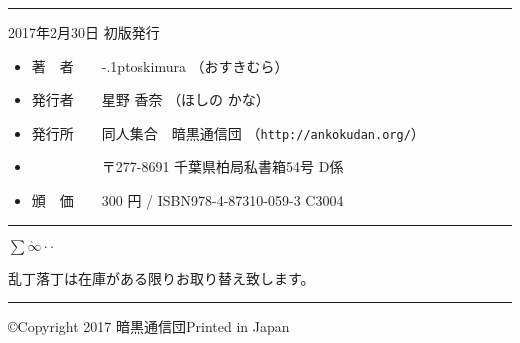 %
\pagestyle{empty}
\mbox{}
\vfill

\baselineskip12pt\parskip0sp\scriptsize\bfseries
\def\cons{\displaystyle\sum \!\!\!\!\!\! \grave{\infty}
\!\!\!\!\!\!\cdot \cdot}

\rule{8cm}{1mm}\par
2017年2月30日 初版発行\par
\begin{itemize}\itemsep0mm\itemindent-5mm\item[]
著　者　　\kern-.1pt{}oskimura {\tiny （おすきむら）}\item[]
発行者　　星野 香奈 {\tiny （ほしの かな）}\item[]
発行所　　{\tiny 同人集合　}暗黒通信団
（\verb!http://ankokudan.org/!）\item[]
　　　　　{\scriptsize 〒277-8691 千葉県柏局私書箱54号 D係}\item[]
頒　価　　300 円 / ISBN978-4-87310-059-3 C3004 \\[-3mm]%
\end{itemize}

\rule{8cm}{1mm}\par
\parbox{8cm}{\hfill{\normalsize$\cons$}{\normalfont\scriptsize
\hfill\parbox{7cm}{
乱丁落丁は在庫がある限りお取り替え致します。
}}}\par
\rule{8cm}{0.1mm}\par
\parbox{8cm}{\footnotesize\copyright Copyright 2017
暗黒通信団\hfill Printed in Japan}
%
